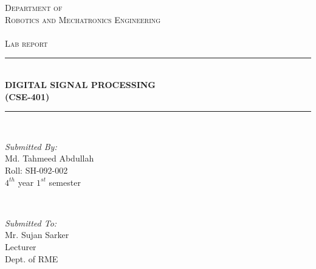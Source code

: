 \documentclass[a4paper,11pt]{article}
\begin{document}
	\begin{titlepage}
		
		\newcommand{\HRule}{\rule{\linewidth}{0.5mm}} %
		
		\center %
		
		
		
		\textsc{\LARGE Department of  }\\[0.3cm] %
		\textsc{\LARGE Robotics and Mechatronics Engineering  }\\[0.3cm]
		\textsc{\Large   }\\[0.3cm]
		\textsc{\Large Lab report }\\[0.5cm] %
		
		\HRule \\[0.4cm]
		{ \huge \bfseries DIGITAL SIGNAL PROCESSING}\\[0.4cm]  
		
		{ \huge \bfseries (CSE-401)}\\[0.03cm]
		\HRule \\[5cm]
		
		
		
		\begin{minipage}{0.4\textwidth}
			\begin{flushleft} \large
				\emph{Submitted By:}\\
				Md. Tahmeed Abdullah \\Roll: SH-092-002\\$4^{th}$ year $1^{st}$ semester %
			\end{flushleft}
		\end{minipage}
		~
		\begin{minipage}{0.4\textwidth}
			\begin{flushright} \large
				\emph{Submitted To:} \\
				Mr. Sujan Sarker\\Lecturer\\Dept. of RME %
			\end{flushright}
		\end{minipage}\\[1cm]
		
		
		
		\vfill
			
		
		
	\end{titlepage}
	\begin{center}
		
	\end{center}
\end{document}
